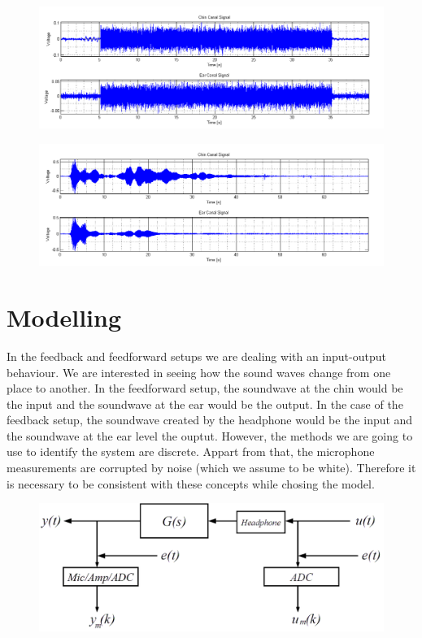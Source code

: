 \begin{figure}[H]
\centering
\includegraphics[width=1.0\textwidth]{pics/Noise}
\caption{}
\label{pic:}
\end{figure}

\begin{figure}[H]
\centering
\includegraphics[width=1.0\textwidth]{pics/Sweep}
\caption{}
\label{pic:}
\end{figure}

\section{Modelling}

In the feedback and feedforward setups we are dealing with an input-output behaviour. We are interested in seeing how the sound waves change from one place to another. In the feedforward setup, the soundwave at the chin would be the input and the soundwave at the ear would be the output. In the case of the feedback setup, the soundwave created by the headphone would be the input and the soundwave at the ear level the ouptut. However, the methods we are going to use to identify the system are discrete. Appart from that, the microphone measurements are corrupted by noise (which we assume to be white). Therefore it is necessary to be consistent with these concepts while chosing the model.\\

\begin{figure}[H]
\centering
\includegraphics[width=1.0\textwidth]{pics/modelfb}
\caption{}
\label{pic:}
\end{figure}

